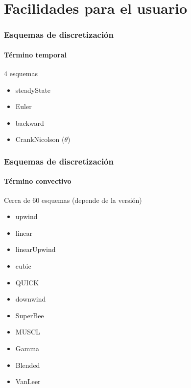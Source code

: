 \section{Facilidades para el usuario}

\begin{frame}
    \frametitle{Esquemas de discretizaci\'on}
    \framesubtitle{T\'ermino temporal}

    4 esquemas
    \begin{itemize}
        \item steadyState
        \item Euler
        \item backward
        \item CrankNicolson ($\theta$)
    \end{itemize}
    


\end{frame} 



\begin{frame}
    \frametitle{Esquemas de discretizaci\'on}
    \framesubtitle{T\'ermino convectivo}
    
    Cerca de 60 esquemas (depende de la versi\'on)
%    
%    
        \begin{itemize}
            \item upwind
            \item linear
            \item linearUpwind
            \item cubic
            \item QUICK
            \item downwind
            \item SuperBee
            \item MUSCL
            \item Gamma
            \item Blended
            \item VanLeer
        \end{itemize}
        

\end{frame} 


